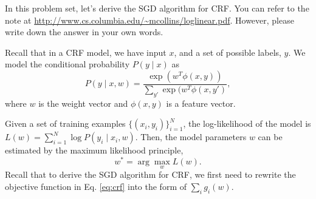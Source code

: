 In this problem set, let's derive the SGD algorithm for CRF. You can refer to the note at \url{http://www.cs.columbia.edu/~mcollins/loglinear.pdf}. However, please write down the answer in your own words.

Recall that in a CRF model, we have input $x$, and a set of possible labels, $y$. We model the conditional probability $P(y\mid x)$ as
\begin{equation}
    P(y\mid x, w) = \frac{\exp(w^T\phi(x,y))}{\sum_{y'} \exp(w^T\phi(x,y')},
\end{equation}
where $w$ is the weight vector and $\phi(x,y)$ is a feature vector.

Given a set of training examples $\{(x_i, y_i)\}_{i=1}^N$, the log-likelihood of the model is $L(w) = \sum_{i=1}^N \log P(y_i\mid x_i, w)$. Then, the model parameters $w$ can be estimated by the maximum likelihood principle,
\begin{equation}
\label{eq:crf}
    w^* = \arg\max_{w} L(w).
\end{equation}
Recall that to derive the SGD  algorithm for CRF, we first need to rewrite the objective function in Eq. \eqref{eq:crf} into the form of $\sum_i g_i(w)$.

